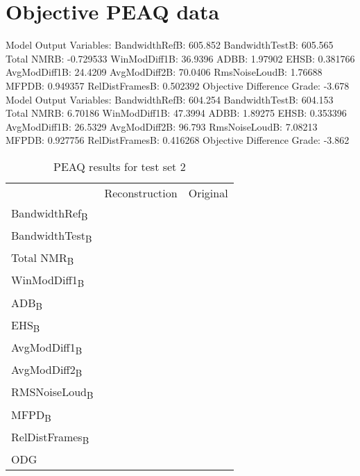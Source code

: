 \chapter{Objective PEAQ data}

Model Output Variables:
   BandwidthRefB: 605.852
  BandwidthTestB: 605.565
      Total NMRB: -0.729533
    WinModDiff1B: 36.9396
            ADBB: 1.97902
            EHSB: 0.381766
    AvgModDiff1B: 24.4209
    AvgModDiff2B: 70.0406
   RmsNoiseLoudB: 1.76688
           MFPDB: 0.949357
  RelDistFramesB: 0.502392
Objective Difference Grade: -3.678
Model Output Variables:
   BandwidthRefB: 604.254
  BandwidthTestB: 604.153
      Total NMRB: 6.70186
    WinModDiff1B: 47.3994
            ADBB: 1.89275
            EHSB: 0.353396
    AvgModDiff1B: 26.5329
    AvgModDiff2B: 96.793
   RmsNoiseLoudB: 7.08213
           MFPDB: 0.927756
  RelDistFramesB: 0.416268
Objective Difference Grade: -3.862

\begin{table}\begin{center}
\caption{PEAQ results for test set 2}
\label{tab:PEAQdata3}
\begin{tabular}{|l|c|c|}
  \hline
                                    & Reconstruction & Original \\
  BandwidthRef\textsubscript{B}     &              & \\
  BandwidthTest\textsubscript{B}    &                & \\
  Total NMR\textsubscript{B}        &                & \\
  WinModDiff1\textsubscript{B}      &                & \\
  ADB\textsubscript{B}              &                & \\
  EHS\textsubscript{B}              &                & \\
  AvgModDiff1\textsubscript{B}      &                & \\
  AvgModDiff2\textsubscript{B}      &                & \\
  RMSNoiseLoud\textsubscript{B}     &                & \\
  MFPD\textsubscript{B}             &                & \\
  RelDistFrames\textsubscript{B}    &                & \\
  ODG                               &                & \\
  \hline
\end{tabular}
\end{center}\end{table}

